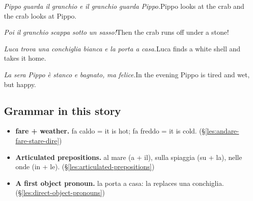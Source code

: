 \documentclass[11pt,a4paper,twoside,openright]{book}
\begin{document}
\begin{sentences}
\item\relax \textit{Pippo guarda il granchio e il granchio guarda Pippo.}\newline Pippo looks at the crab and the crab looks at Pippo.
\item\relax \textit{Poi il granchio scappa sotto un sasso!}\newline Then the crab runs off under a stone!
\item\relax \textit{Luca trova una conchiglia bianca e la porta a casa.}\newline Luca finds a white shell and takes it home.
\item\relax \textit{La sera Pippo è stanco e bagnato, ma felice.}\newline In the evening Pippo is tired and wet, but happy.
\end{sentences}
\subsection*{Grammar in this story}
\begin{itemize}
\item\relax \textbf{fare + weather.} fa caldo = it is hot; fa freddo = it is cold. (\S\ref{les:andare-fare-stare-dire})
\item\relax \textbf{Articulated prepositions.} al mare (a + il), sulla spiaggia (su + la), nelle onde (in + le). (\S\ref{les:articulated-prepositions})
\item\relax \textbf{A first object pronoun.} la porta a casa: la replaces una conchiglia. (\S\ref{les:direct-object-pronouns})
\end{itemize}
\end{document}
